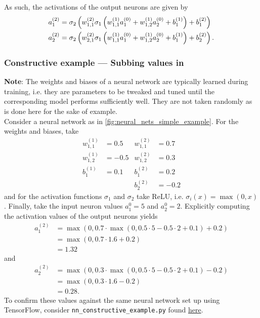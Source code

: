 \documentclass[11pt]{article}
\begin{document}
\noindent As such, the activations of the output neurons are given by
\begin{align*}
    a_1^{(2)}&=\sigma_2\left(w_{1,1}^{(2)}\sigma_1\left(w_{1,1}^{(1)}a_1^{(0)}+w_{1,2}^{(1)}a_2^{(0)}+b_1^{(1)}\right) + b_1^{(2)}\right)\\
    a_2^{(2)}&=\sigma_2\left(w_{2,1}^{(2)}\sigma_1\left(w_{1,1}^{(1)}a_1^{(0)}+w_{1,2}^{(1)}a_2^{(0)}+b_1^{(1)}\right) + b_2^{(2)}\right).
\end{align*}

\subsubsection{Constructive example — Subbing values in}

\noindent\textbf{Note}: The weights and biases of a neural network are typically learned during training, i.e. they are parameters to be tweaked and tuned until the corresponding model performs sufficiently well. They are not taken randomly as is done here for the sake of example.\\

\noindent Consider a neural network as in \autoref{fig:neural_nets_simple_example}. For the weights and biases, take
\begin{align*}
    w_{1,1}^{(1)} & =  0.5 & w_{1,1}^{(2)} &= 0.7 \\
    w_{1,2}^{(1)} & = -0.5 & w_{1,2}^{(2)} &= 0.3 \\
    b_1^{(1)}     & =  0.1 & b_1^{(2)}     & =  0.2 \\
                  &        & b_2^{(2)}     & = -0.2
\end{align*}
and for the activation functions $\sigma_1$ and $\sigma_2$ take ReLU, i.e. $\sigma_i(x)=\max(0, x)$.  Finally, take the input neuron values $a_1^{0}=5$ and $a_2^{0}=2$. Explicitly computing the activation values of the output neurons yields
\begin{align*}
    a_1^{(2)}
    &=
    \max(0, 0.7\cdot\max(0, 0.5\cdot5-0.5\cdot2+0.1)+0.2)\\
    &=
    \max(0, 0.7\cdot1.6+0.2)\\
    &=1.32
\end{align*}
and
\begin{align*}
    a_2^{(2)}
    &=
    \max(0, 0.3\cdot\max(0, 0.5\cdot5-0.5\cdot2+0.1)-0.2)\\
    &=
    \max(0, 0.3\cdot1.6-0.2)\\
    &=0.28.
\end{align*}
To confirm these values against the same neural network set up using TensorFlow, consider \texttt{nn\_constructive\_example.py} found \href{https://gitlab.com/dewibatista/master/-/tree/main/_Done/Personal}{here}.
\end{document}
